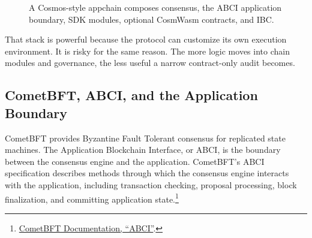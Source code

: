 \begin{figure}[htbp]
\centering
{}
\caption{A Cosmos-style appchain composes consensus, the ABCI application boundary, SDK modules, optional CosmWasm contracts, and IBC.}
\end{figure}

That stack is powerful because the protocol can customize its own execution environment. It is risky for the same reason. The more logic moves into chain modules and governance, the less useful a narrow contract-only audit becomes.

\subsection{CometBFT, ABCI, and the Application Boundary}

CometBFT provides Byzantine Fault Tolerant consensus for replicated state machines. The Application Blockchain Interface, or ABCI, is the boundary between the consensus engine and the application. CometBFT's ABCI specification describes methods through which the consensus engine interacts with the application, including transaction checking, proposal processing, block finalization, and committing application state.\footnote{\href{https://docs.cometbft.com/main/spec/abci/}{CometBFT Documentation, ``ABCI''}.}


